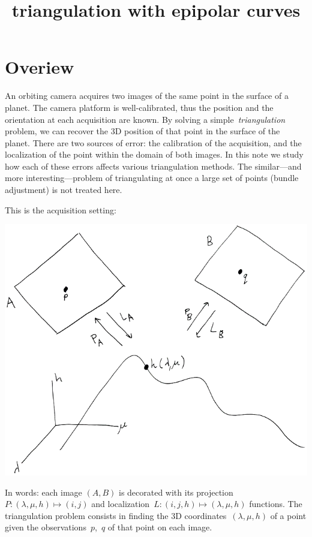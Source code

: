 \title{triangulation with epipolar curves}



\newcommand{\1}{\mathbf{1}}
\newcommand{\R}{\mathbf{R}}
\newcommand{\T}{\mathbf{T}}
\newcommand{\Z}{\mathbf{Z}}
\newcommand{\ud}{\mathrm{d}}
\newcommand{\ds}{\displaystyle}
\def\argmin{\mathop{\rm argmin}}


\section{Overiew}

An orbiting camera acquires two images of the same point in the surface of a
planet.  The camera platform is well-calibrated, thus the position and the
orientation at each acquisition are known.  By solving a
simple~\emph{triangulation} problem, we can recover the 3D position of that
point in the surface of the planet.
There are two sources of error: the calibration of the acquisition, and the
localization of the point within the domain of both images.  In this note we
study how each of these errors affects various triangulation methods.
The similar---and more interesting---problem of triangulating at once a large
set of points (bundle adjustment) is not treated here.

This is the acquisition setting:
\begin{center}
	\includegraphics[width=0.6\linewidth]{tworpcs.png}
\end{center}
In words: each image $(A,B)$ is decorated with its
projection~$P:(\lambda,\mu,h)\mapsto(i,j)$ and
localization~$L:(i,j,h)\mapsto(\lambda,\mu,h)$ functions.  The triangulation
problem consists in finding the 3D coordinates~$(\lambda,\mu,h)$ of a point
given the observations~$p$,~$q$ of that point on each image.

